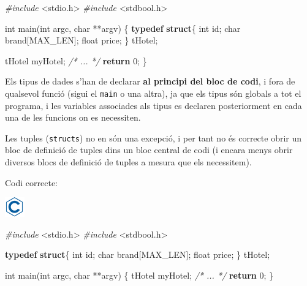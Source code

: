 \documentclass[
]{book}
\newenvironment{Shaded}{\begin{snugshade}}{\end{snugshade}}
\newcommand{\CommentTok}[1]{\textcolor[rgb]{0.56,0.35,0.01}{\textit{#1}}}
\newcommand{\ControlFlowTok}[1]{\textcolor[rgb]{0.13,0.29,0.53}{\textbf{#1}}}
\newcommand{\DataTypeTok}[1]{\textcolor[rgb]{0.13,0.29,0.53}{#1}}
\newcommand{\DecValTok}[1]{\textcolor[rgb]{0.00,0.00,0.81}{#1}}
\newcommand{\ImportTok}[1]{#1}
\newcommand{\KeywordTok}[1]{\textcolor[rgb]{0.13,0.29,0.53}{\textbf{#1}}}
\newcommand{\NormalTok}[1]{#1}
\newcommand{\PreprocessorTok}[1]{\textcolor[rgb]{0.56,0.35,0.01}{\textit{#1}}}
\begin{document}
\begin{Shaded}
\begin{Highlighting}[]
\PreprocessorTok{\#include }\ImportTok{\textless{}stdio.h\textgreater{}}
\PreprocessorTok{\#include }\ImportTok{\textless{}stdbool.h\textgreater{}}

\DataTypeTok{int}\NormalTok{ main(}\DataTypeTok{int}\NormalTok{ argc, }\DataTypeTok{char}\NormalTok{ **argv) \{}
    \KeywordTok{typedef} \KeywordTok{struct}\NormalTok{\{}
        \DataTypeTok{int}\NormalTok{ id;}
        \DataTypeTok{char}\NormalTok{ brand[MAX\_LEN];}
        \DataTypeTok{float}\NormalTok{ price;}
\NormalTok{    \} tHotel;}

\NormalTok{    tHotel myHotel;}
    \CommentTok{/* ... */}
    \ControlFlowTok{return} \DecValTok{0}\NormalTok{;}
\NormalTok{\}}
\end{Highlighting}
\end{Shaded}

Els tipus de dades s'han de declarar \textbf{al principi del bloc de codi}, i fora de qualsevol funció (sigui el \texttt{main} o una altra), ja que els tipus són globals a tot el programa, i les variables associades als tipus es declaren posteriorment en cada una de les funcions on es necessiten.

Les tuples (\texttt{structs}) no en són una excepció, i per tant no és correcte obrir un bloc de definició de tuples dins un bloc central de codi (i encara menys obrir diversos blocs de definició de tuples a mesura que els necessitem).

Codi correcte:

\includegraphics{./img/c.png}

\begin{Shaded}
\begin{Highlighting}[]
\PreprocessorTok{\#include }\ImportTok{\textless{}stdio.h\textgreater{}}
\PreprocessorTok{\#include }\ImportTok{\textless{}stdbool.h\textgreater{}}

\KeywordTok{typedef} \KeywordTok{struct}\NormalTok{\{}
    \DataTypeTok{int}\NormalTok{ id;}
    \DataTypeTok{char}\NormalTok{ brand[MAX\_LEN];}
    \DataTypeTok{float}\NormalTok{ price;}
\NormalTok{\} tHotel;}

\DataTypeTok{int}\NormalTok{ main(}\DataTypeTok{int}\NormalTok{ argc, }\DataTypeTok{char}\NormalTok{ **argv) \{}
\NormalTok{    tHotel myHotel;}
    \CommentTok{/* ... */}
    \ControlFlowTok{return} \DecValTok{0}\NormalTok{;}
\NormalTok{\}}
\end{Highlighting}
\end{Shaded}
\end{document}

